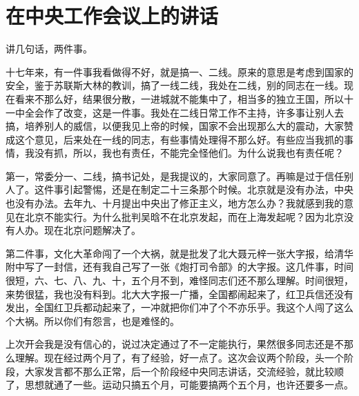 \section[在中央工作会议上的讲话（一九六六年十月二十五日）]{在中央工作会议上的讲话}


讲几句话，两件事。

十七年来，有一件事我看做得不好，就是搞一、二线。原来的意思是考虑到国家的安全，鉴于苏联斯大林的教训，搞了一线二线，我处在二线，别的同志在一线。现在看来不那么好，结果很分散，一进城就不能集中了，相当多的独立王国，所以十一中全会作了改变，这是一件事。我处在二线日常工作不主持，许多事让别人去搞，培养别人的威信，以便我见上帝的时候，国家不会出现那么大的震动，大家赞成这个意见，后来处在一线的同志，有些事情处理得不那么好。有些应当我抓的事情，我没有抓，所以，我也有责任，不能完全怪他们。为什么说我也有责任呢？

第一，常委分一、二线，搞书记处，是我提议的，大家同意了。再嘛是过于信任别人了。这件事引起警惕，还是在制定二十三条那个时候。北京就是没有办法，中央也没有办法。去年九、十月提出中央出了修正主义，地方怎么办？我就感到我的意见在北京不能实行。为什么批判吴晗不在北京发起，而在上海发起呢？因为北京没有人办。现在北京问题解决了。

第二件事，文化大革命闯了一个大祸，就是批发了北大聂元梓一张大字报，给清华附中写了一封信，还有我自己写了一张《炮打司令部》的大字报。这几件事，时间很短，六、七、八、九、十，五个月不到，难怪同志们还不那么理解。时间很短，来势很猛，我也没有料到。北大大字报一广播，全国都闹起来了，红卫兵信还没有发出，全国红卫兵都动起来了，一冲就把你们冲了个不亦乐乎。我这个人闯了这么个大祸。所以你们有怨言，也是难怪的。

上次开会我是没有信心的，说过决定通过了不一定能执行，果然很多同志还是不那么理解。现在经过两个月了，有了经验，好一点了。这次会议两个阶段，头一个阶段，大家发言都不那么正常，后一个阶段经中央同志讲话，交流经验，就比较顺了，思想就通了一些。运动只搞五个月，可能要搞两个五个月，也许还要多一点。

